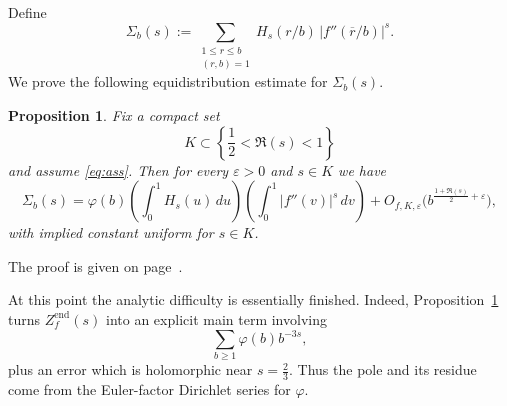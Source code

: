 \documentclass[a4paper,american,11pt]{amsart}
\theoremstyle{plain}
\newtheorem{proposition}[theorem]{Proposition}
\theoremstyle{definition}
\begin{document}
Define
\[
\Sigma_b(s)
:=
\sum_{\substack{1\le r\le b\\(r,b)=1}}
H_s(r/b)\,|f''(\overline r/b)|^s.
\]
We prove the following equidistribution estimate for \(\Sigma_b(s)\).

\begin{proposition}
\label{prop:spec}
Fix a compact set
\[
K\subset\left\{\frac12<\Re(s)<1\right\}
\]
and assume \eqref{eq:ass}. Then for every \(\varepsilon>0\) and \(s\in K\)
we have
\[
\Sigma_b(s)
=
\varphi(b)
\left(\int_0^1 H_s(u)\,du\right)
\left(\int_0^1 |f''(v)|^s\,dv\right)
+
O_{f,K,\varepsilon}
\bigl(b^{\frac{1+\Re(s)}{2}+\varepsilon}\bigr),
\]
with implied constant uniform for \(s\in K\).
\end{proposition}

The proof is given on page~\pageref{proof:prop:spec}.

At this point the analytic difficulty is essentially finished. Indeed,
Proposition~\ref{prop:spec} turns \(Z_f^{\mathrm{end}}(s)\) into an explicit
main term involving
\[
\sum_{b\ge1}\varphi(b)b^{-3s},
\]
plus an error which is holomorphic near \(s=\frac23\). Thus the pole and its
residue come from the Euler-factor Dirichlet series for \(\varphi\).
\end{document}
